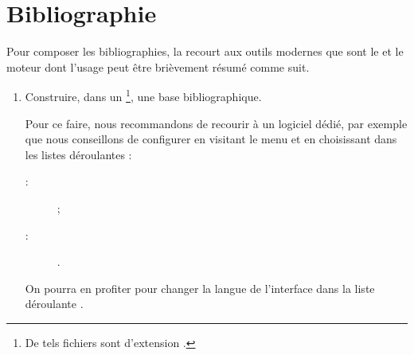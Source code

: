 \documentclass[english,nolocaltoc]{nwejmart}
\newtheorem[style=definition]{fait}
\newtheorem[title=expérience]{experience}
\newtheorem[title-plural=anneaux]{anneau}
\newtheorem[title=idéal,title-plural=idéaux]{ideal}
\begin{document}
\section{Bibliographie}
\label{sec-bibliographie}

Pour composer les bibliographies, la \nwejmauthorcl{} recourt aux outils
modernes que sont le  et le moteur  dont
l'usage peut être brièvement résumé comme suit\autocite[Pour plus de détails,
cf. par exemple][en français]{Bitouze}.
\begin{enumerate}
\item Construire, dans un \footnote{De tels
    fichiers sont d'extension .}, une base bibliographique.

  Pour ce faire, nous recommandons de recourir à un logiciel dédié, par exemple
  \href{http://jabref.sourceforge.net/}{} que nous conseillons
  de configurer en visitant le menu
   et en choisissant dans les listes
  déroulantes :
  \begin{description}
  \item[ :]  ;
  \item[ :] .
  \end{description}
  On pourra en profiter pour changer la langue de l'interface dans la liste
  déroulante .


\end{enumerate}
\end{document}

